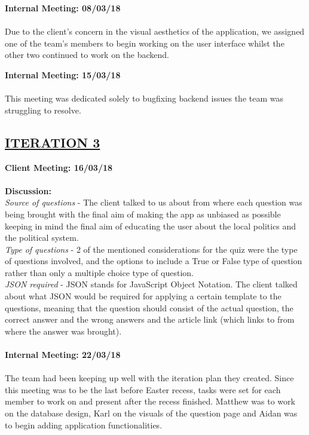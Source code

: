 \documentclass[paper=a4,fontsize=11pt]{article}
\newcommand{\sepspace}{\vspace*{1em}}		%
\newcommand{\sephalfspace}{\vspace*{0.3em}}		%
\newcommand{\SectionPart}[1]{\subsection*{\uppercase{#1}}}
\begin{document}
\hfill \textbf{Internal Meeting: 08/03/18}\\
\\
\noindent
Due to the client's concern in the visual aesthetics of the application, we assigned one of the team's
members to begin working on the user interface whilst the other two continued to work on the backend.\\
\sephalfspace

\hfill \textbf{Internal Meeting: 15/03/18}\\
\\
\noindent
This meeting was dedicated solely to bugfixing backend issues the team was struggling to resolve. \\
\sepspace

\SectionPart{\ul{Iteration 3}}
\hfill \textbf{Client Meeting: 16/03/18} \\
\\
\textbf{Discussion:}\\
\noindent
\textit{Source of questions} -
The client talked to us about from where each question was being brought with the final aim
of making the app as unbiased as possible keeping in mind the final aim of educating the user
about the local politics and the political system.\\

\noindent
\textit{Type of questions} -
2 of the mentioned considerations for the quiz were the type of questions involved, and the
options to include a True or False type of question rather than only a multiple choice type of
question.\\

\noindent
\textit{JSON required} -
JSON stands for JavaScript Object Notation. The client talked about what JSON would be
required for applying a certain template to the questions, meaning that the question should
consist of the actual question, the correct answer and the wrong answers and the article link
(which links to from where the answer was brought).\\\\

\hfill \textbf{Internal Meeting: 22/03/18}\\
\\
\noindent
The team had been keeping up well with the iteration plan they created. Since this meeting was to be
the last before Easter recess, tasks were set for each member to work on and present after the recess
finished. Matthew was to work on the database design, Karl on the visuals of the question page and Aidan
was to begin adding application functionalities.\\
\sepspace
\end{document}
